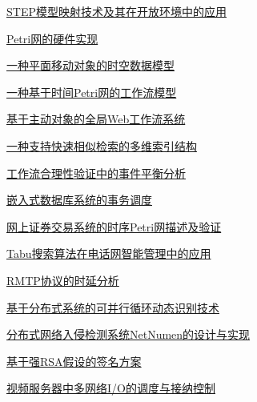 \documentclass[a4paper]{article}
\begin{document}
\href{http://www.jos.org.cn/ch/reader/download_pdf.aspx?file_no=20020842&year_id=2002&quarter_id=8&falg=1}{STEP模型映射技术及其在开放环境中的应用}

\href{http://www.jos.org.cn/ch/reader/download_pdf.aspx?file_no=20020843&year_id=2002&quarter_id=8&falg=1}{Petri网的硬件实现}

\href{http://www.jos.org.cn/ch/reader/download_pdf.aspx?file_no=20020844&year_id=2002&quarter_id=8&falg=1}{一种平面移动对象的时空数据模型}

\href{http://www.jos.org.cn/ch/reader/download_pdf.aspx?file_no=20020845&year_id=2002&quarter_id=8&falg=1}{一种基于时间Petri网的工作流模型}

\href{http://www.jos.org.cn/ch/reader/download_pdf.aspx?file_no=20020846&year_id=2002&quarter_id=8&falg=1}{基于主动对象的全局Web工作流系统}

\href{http://www.jos.org.cn/ch/reader/download_pdf.aspx?file_no=20020847&year_id=2002&quarter_id=8&falg=1}{一种支持快速相似检索的多维索引结构}

\href{http://www.jos.org.cn/ch/reader/download_pdf.aspx?file_no=20020848&year_id=2002&quarter_id=8&falg=1}{工作流合理性验证中的事件平衡分析}

\href{http://www.jos.org.cn/ch/reader/download_pdf.aspx?file_no=20020849&year_id=2002&quarter_id=8&falg=1}{嵌入式数据库系统的事务调度}

\href{http://www.jos.org.cn/ch/reader/download_pdf.aspx?file_no=20020850&year_id=2002&quarter_id=8&falg=1}{网上证券交易系统的时序Petri网描述及验证}

\href{http://www.jos.org.cn/ch/reader/download_pdf.aspx?file_no=20020851&year_id=2002&quarter_id=8&falg=1}{Tabu搜索算法在电话网智能管理中的应用}

\href{http://www.jos.org.cn/ch/reader/download_pdf.aspx?file_no=20020852&year_id=2002&quarter_id=8&falg=1}{RMTP协议的时延分析}

\href{http://www.jos.org.cn/ch/reader/download_pdf.aspx?file_no=20020853&year_id=2002&quarter_id=8&falg=1}{基于分布式系统的可并行循环动态识别技术}

\href{http://www.jos.org.cn/ch/reader/download_pdf.aspx?file_no=20020854&year_id=2002&quarter_id=8&falg=1}{分布式网络入侵检测系统NetNumen的设计与实现}

\href{http://www.jos.org.cn/ch/reader/download_pdf.aspx?file_no=20020855&year_id=2002&quarter_id=8&falg=1}{基于强RSA假设的签名方案}

\href{http://www.jos.org.cn/ch/reader/download_pdf.aspx?file_no=20020856&year_id=2002&quarter_id=8&falg=1}{视频服务器中多网络I/O的调度与接纳控制}
\end{document}
